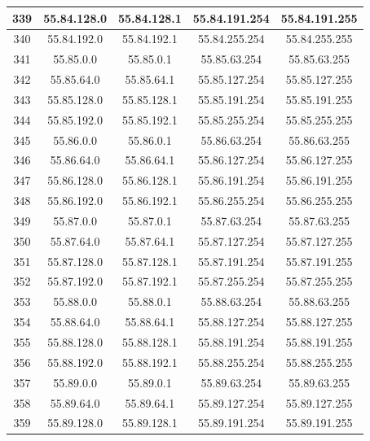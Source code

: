 \documentclass[letterpaper,12pt]{article}
\begin{document}
\begin{center}
\begin{longtable}{|c|c|c|c|c|}
                339 & 55.84.128.0 & 55.84.128.1 & 55.84.191.254 & 55.84.191.255 \\ \hline
                340 & 55.84.192.0 & 55.84.192.1 & 55.84.255.254 & 55.84.255.255 \\ \hline
                341 & 55.85.0.0 & 55.85.0.1 & 55.85.63.254 & 55.85.63.255 \\ \hline
                342 & 55.85.64.0 & 55.85.64.1 & 55.85.127.254 & 55.85.127.255 \\ \hline
                343 & 55.85.128.0 & 55.85.128.1 & 55.85.191.254 & 55.85.191.255 \\ \hline
                344 & 55.85.192.0 & 55.85.192.1 & 55.85.255.254 & 55.85.255.255 \\ \hline
                345 & 55.86.0.0 & 55.86.0.1 & 55.86.63.254 & 55.86.63.255 \\ \hline
                346 & 55.86.64.0 & 55.86.64.1 & 55.86.127.254 & 55.86.127.255 \\ \hline
                347 & 55.86.128.0 & 55.86.128.1 & 55.86.191.254 & 55.86.191.255 \\ \hline
                348 & 55.86.192.0 & 55.86.192.1 & 55.86.255.254 & 55.86.255.255 \\ \hline
                349 & 55.87.0.0 & 55.87.0.1 & 55.87.63.254 & 55.87.63.255 \\ \hline
                350 & 55.87.64.0 & 55.87.64.1 & 55.87.127.254 & 55.87.127.255 \\ \hline
                351 & 55.87.128.0 & 55.87.128.1 & 55.87.191.254 & 55.87.191.255 \\ \hline
                352 & 55.87.192.0 & 55.87.192.1 & 55.87.255.254 & 55.87.255.255 \\ \hline
                353 & 55.88.0.0 & 55.88.0.1 & 55.88.63.254 & 55.88.63.255 \\ \hline
                354 & 55.88.64.0 & 55.88.64.1 & 55.88.127.254 & 55.88.127.255 \\ \hline
                355 & 55.88.128.0 & 55.88.128.1 & 55.88.191.254 & 55.88.191.255 \\ \hline
                356 & 55.88.192.0 & 55.88.192.1 & 55.88.255.254 & 55.88.255.255 \\ \hline
                357 & 55.89.0.0 & 55.89.0.1 & 55.89.63.254 & 55.89.63.255 \\ \hline
                358 & 55.89.64.0 & 55.89.64.1 & 55.89.127.254 & 55.89.127.255 \\ \hline
                359 & 55.89.128.0 & 55.89.128.1 & 55.89.191.254 & 55.89.191.255 \\ \hline

\end{longtable}
\end{center}
\end{document}
